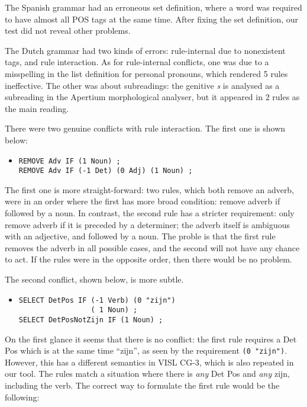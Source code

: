 The Spanish grammar had an erroneous set definition, where a word was
required to have almost all POS tags at the same time. After fixing
the set definition, our test did not reveal other problems.

The Dutch grammar had two kinds of errors: rule-internal due to nonexistent tags, and rule interaction. As for rule-internal conflicts, one was due to a misspelling in the list definition for personal pronouns, which rendered 5 rules ineffective. The other was about subreadings: the genitive \emph{s} is analysed as a subreading in the Apertium morphological analyser, but it appeared in 2 rules as the main reading. 

There were two genuine conflicts with rule interaction. The first one is shown below:

\begin{itemize}
\item[] 
\begin{verbatim}REMOVE Adv IF (1 Noun) ;
REMOVE Adv IF (-1 Det) (0 Adj) (1 Noun) ;
\end{verbatim}
\end{itemize}

The first one is more straight-forward: two rules, which both remove an adverb, were in an order where the first has more broad condition: remove adverb if followed by a noun. In contrast, the second rule has a stricter requirement: only remove adverb if it is preceded by a determiner; the adverb itself is ambiguous with an adjective, and followed by a noun. The proble is that the first rule removes the adverb in all possible cases, and the second will not have any chance to act. If the rules were in the opposite order, then there would be no problem.


The second conflict, shown below, is more subtle. 

\begin{itemize}
\item[] 
\begin{verbatim}SELECT DetPos IF (-1 Verb) (0 "zijn") 
                 ( 1 Noun) ;
SELECT DetPosNotZijn IF (1 Noun) ;
\end{verbatim}
\end{itemize}

On the first glance it seems that there is no conflict: the first rule requires a Det Pos which is at the same time ``zijn'', as seen by the requirement \texttt{(0 "zijn")}. However, this has a different semantics in VISL CG-3, which is also repeated in our tool. The rules match a situation where there is \emph{any} Det Pos and \emph{any} zijn, including the verb. The correct way to formulate the first rule would be the following:

